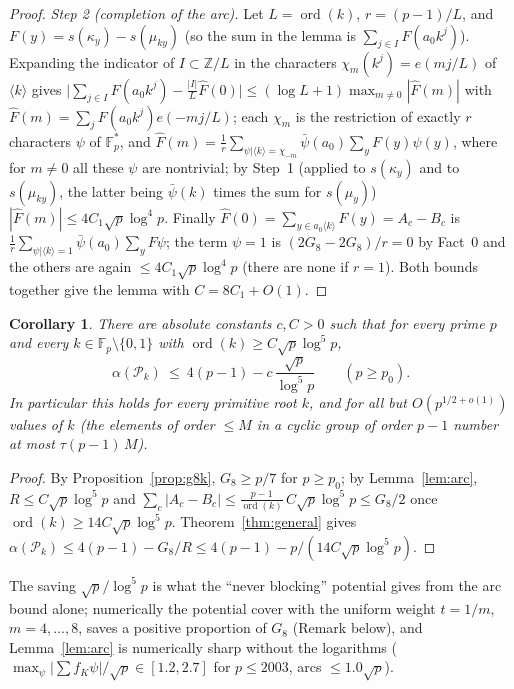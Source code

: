 \documentclass[11pt]{article}
\newtheorem{corollary}[theorem]{Corollary}
\theoremstyle{remark}
\newcommand{\Fp}{\mathbb{F}_p}
\newcommand{\Z}{\mathbb{Z}}
\newcommand{\Pset}{\mathcal{P}}
\begin{document}
\begin{proof}
\emph{Step 2 (completion of the arc).}  Let $L=\operatorname{ord}(k)$, $r=(p-1)/L$, and $F(y)=s(\kappa_y)-s(\mu_{ky})$ (so the sum in the lemma is
$\sum_{j\in I}F(a_0k^j)$).  Expanding the indicator of $I\subset\Z/L$ in the characters $\chi_m(k^j)=e(mj/L)$ of $\langle k\rangle$ gives
$\bigl|\sum_{j\in I}F(a_0k^j)-\tfrac{|I|}{L}\hat F(0)\bigr|\le(\log L+1)\max_{m\ne0}|\hat F(m)|$ with $\hat F(m)=\sum_jF(a_0k^j)e(-mj/L)$; each
$\chi_m$ is the restriction of exactly $r$ characters $\psi$ of $\Fp^*$, and $\hat F(m)=\tfrac1r\sum_{\psi|\langle k\rangle=\chi_{-m}}\bar\psi(a_0)
\sum_yF(y)\psi(y)$, where for $m\ne0$ all these $\psi$ are nontrivial; by Step~1 (applied to $s(\kappa_y)$ and to $s(\mu_{ky})$, the latter being
$\bar\psi(k)$ times the sum for $s(\mu_y)$) $|\hat F(m)|\le4C_1\sqrt p\log^4p$.  Finally $\hat F(0)=\sum_{y\in a_0\langle k\rangle}F(y)=A_c-B_c$ is
$\tfrac1r\sum_{\psi|\langle k\rangle=1}\bar\psi(a_0)\sum_yF\psi$; the term $\psi=1$ is $(2G_8-2G_8)/r=0$ by Fact~0 and the others are again
$\le4C_1\sqrt p\log^4p$ (there are none if $r=1$).  Both bounds together give the lemma with $C=8C_1+O(1)$.
\end{proof}

\begin{corollary}\label{cor:general}
There are absolute constants $c,C>0$ such that for every prime $p$ and every $k\in\Fp\setminus\{0,1\}$ with $\operatorname{ord}(k)\ge C\sqrt p\log^5p$,
\[
 \alpha(\Pset_k)\ \le\ 4(p-1)-c\,\frac{\sqrt p}{\log^5p}\qquad(p\ge p_0).
\]
In particular this holds for every primitive root $k$, and for all but $O(p^{1/2+o(1)})$ values of $k$ (the elements of order $\le M$ in a
cyclic group of order $p-1$ number at most $\tau(p-1)\,M$).
\end{corollary}
\begin{proof}
By Proposition~\ref{prop:g8k}, $G_8\ge p/7$ for $p\ge p_0$; by Lemma~\ref{lem:arc}, $R\le C\sqrt p\log^5p$ and
$\sum_c|A_c-B_c|\le\frac{p-1}{\operatorname{ord}(k)}\,C\sqrt p\log^5p\le G_8/2$ once $\operatorname{ord}(k)\ge14C\sqrt p\log^5p$.  Theorem~\ref{thm:general}
gives $\alpha(\Pset_k)\le4(p-1)-G_8/R\le4(p-1)-p/(14C\sqrt p\log^5p)$.
\end{proof}
The saving $\sqrt p/\log^5p$ is what the ``never blocking'' potential gives from the arc bound alone; numerically the potential cover with the
uniform weight $t=1/m$, $m=4,\dots,8$, saves a positive proportion of $G_8$ (Remark below), and Lemma~\ref{lem:arc} is numerically sharp
without the logarithms ($\max_\psi|\sum f_K\psi|/\sqrt p\in[1.2,2.7]$ for $p\le2003$, arcs $\le1.0\sqrt p$).
\end{document}

